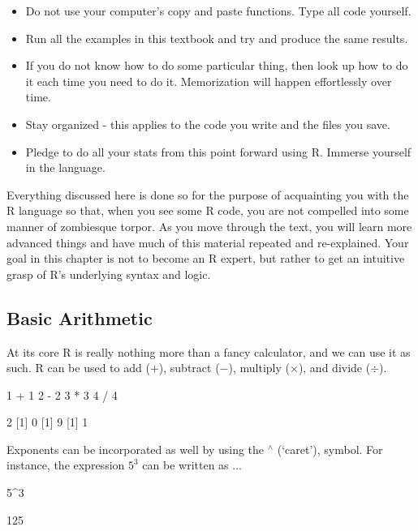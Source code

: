 \begin{itemize}
    \item Do not use your computer's copy and paste functions.  Type all code yourself.
    \item Run all the examples in this textbook and try and produce the same results.
    \item If you do not know how to do some particular thing, then look up how to do it each time you need to do it. Memorization will happen effortlessly over time.
    \item Stay organized - this applies to the code you write and the files you save.
    \item Pledge to do all your stats from this point forward using R. Immerse yourself in the language.
\end{itemize}

\noindent
Everything discussed here is done so for the purpose of acquainting you with the R language so that, when you see some R code, you are not compelled into some manner of zombiesque torpor.  As you move through the text, you will learn more advanced things and have much of this material repeated and re-explained.  Your goal in this chapter is not to become an R expert, but rather to get an intuitive grasp of R's underlying syntax and logic.


\subsection{Basic Arithmetic}

At its core R is really nothing more than a fancy calculator, and we can use it as such.  R can be used to add ($+$), subtract ($-$), multiply ($\times$), and divide ($\div$).

\begin{inR}
1 + 1
2 - 2
3 * 3
4 / 4
\end{inR}

\begin{outR}
[1] 2
[1] 0
[1] 9
[1] 1
\end{outR}

Exponents can be incorporated as well by using the $^\wedge$ (`caret'), symbol. For instance, the expression $5^3$ can be written as ...

\begin{inR}
5^3
\end{inR}

\begin{outR}
[1] 125
\end{outR}

